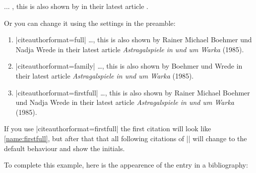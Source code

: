 \documentclass[a4paper,
10pt,
greek,
french,
spanish,
italian,
ngerman,
english
]{ltxdoc}
\begin{document}
\begin{refsection}
\begin{example}
... , this is also shown by \citeauthor{Boehmer1985} 
 in their latest article .
 \end{example}



Or you can change it using the settings in the preamble:

\begin{enumerate}
\item\label{name:full} 
\begin{tcolorbox}[examplebox]
 |citeauthorformat=full| 
 \tcblower
\ldots , this is also shown by {\color{red}Rainer Michael Boehmer  und Nadja Wrede} in their latest article \emph{Astragalspiele in und um Warka} (1985).
\end{tcolorbox}
\item\label{name:family}
\begin{tcolorbox}[examplebox]
 |citeauthorformat=family| 
 \tcblower
\ldots , this is also shown by {\color{red}Boehmer und  Wrede} in their latest article \emph{Astragalspiele in und um Warka} (1985).
\end{tcolorbox}
\item\label{name:firstfull}
\begin{tcolorbox}[examplebox]
 |citeauthorformat=firstfull| 
 \tcblower
\ldots , this is also shown by {\color{red}Rainer Michael Boehmer  und Nadja Wrede} in their latest article \emph{Astragalspiele in und um Warka} (1985).
\end{tcolorbox}
\end{enumerate}


If you use |citeauthorformat=firstfull| the first citation will look like \ref{name:firstfull}, but after that that all following citations of |\citeauthor{Boehmer1985}| will change to the default behaviour and show the initials.
\end{refsection}

To complete this example,
here is the appearence of the entry in a bibliography:
\end{document}
